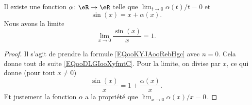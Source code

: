 \begin{corollary}
	Il existe une fonction \( \alpha\colon \eR\to \eR\) telle que \( \lim_{t\to 0} \alpha(t)/t=0\) et
	\begin{equation}        \label{EQooDLGIooXyfmtC}
		\sin(x)=x+\alpha(x).
	\end{equation}
	Nous avons la limite
	\begin{equation}
		\lim_{x\to 0} \frac{ \sin(x) }{ x }=1.
	\end{equation}
\end{corollary}

\begin{proof}
	Il s'agit de prendre la formule \eqref{EQooKYJAooRebHgc} avec \( n=0\). Cela donne tout de suite \eqref{EQooDLGIooXyfmtC}. Pour la limite, on divise par \( x\), ce qui donne (pour tout \( x\neq 0\))
	\begin{equation}
		\frac{ \sin(x) }{ x }=1+\frac{ \alpha(x) }{ x }.
	\end{equation}
	Et justement la fonction \( \alpha\) a la propriété que \( \lim_{x\to 0} \alpha(x)/x=0\).
\end{proof}

